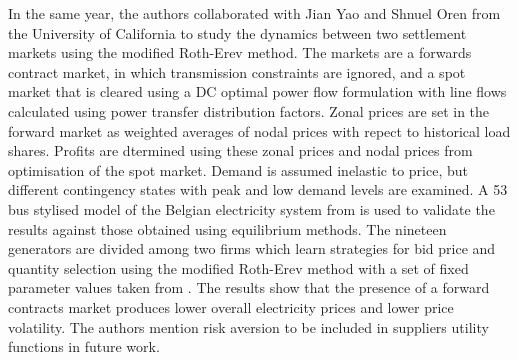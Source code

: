 In the same year, the authors collaborated with Jian Yao and Shnuel Oren from
the University of California to study the dynamics between two settlement
markets using the modified Roth-Erev method.  The markets are a forwards
contract market, in which transmission constraints are ignored, and a spot
market that is cleared using a DC optimal power flow formulation with line
flows calculated using power transfer distribution factors.  Zonal prices are
set in the forward market as weighted averages of nodal prices with repect to
historical load shares.  Profits are dtermined using these zonal prices and
nodal prices from optimisation of the spot market.  Demand is assumed
inelastic to price, but different contingency states with peak and low demand
levels are examined.  A 53 bus stylised model of the Belgian electricity
system from \cite{yao:07,yao:08} is used to validate the results against those
obtained using equilibrium methods.  The nineteen generators are divided among
two firms which learn strategies for bid price and quantity selection using the
modified Roth-Erev method with a set of fixed parameter values taken from
\cite{roth:aer}.  The results show that the presence of a forward contracts
market produces lower overall electricity prices and lower price volatility.
The authors mention risk aversion to be included in suppliers utility
functions in future work.




